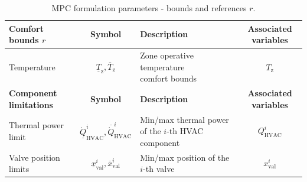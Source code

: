 \documentclass[10pt]{extarticle}
\begin{document}
\renewcommand{\arraystretch}{2}
\begin{table}[htbp]
	\centering
	\caption{MPC formulation parameters - bounds and references $r$.}
	\label{tab:mpc_form:parameters:bounds}
	\begin{tabular}{l|c|l|c}
		\toprule
		\textbf{Comfort bounds $r$}  & \textbf{Symbol} &  \textbf{Description} & \textbf{Associated variables} \\
		\midrule
		Temperature & $\underline{T}_{\text{z}},\overline{T}_{\text{z}}$ & \makecell[l]{Zone operative temperature  \\ comfort bounds } & $T_{\text{z}}$ \\
		\bottomrule 
		\textbf{Component limitations}  & \textbf{Symbol} &  \textbf{Description} & \textbf{Associated variables} \\
		\midrule
		Thermal power limit & $\underline{\dot{Q}}^i_{\text{HVAC}},\overline{\dot{Q}}^i_{\text{HVAC}}$ & \makecell[l]{Min/max thermal power of \\ the $i$-th HVAC component} & $Q^i_{\text{HVAC}}$ \\
		Valve position limits & $\underline{ x}^i_{\text{val}},\overline{ x}^i_{\text{val}}$ & \makecell[l]{Min/max position of \\  the  $i$-th valve} & $x^i_{\text{val}}$ \\
		\bottomrule 
	\end{tabular}
\end{table}



\end{document}
